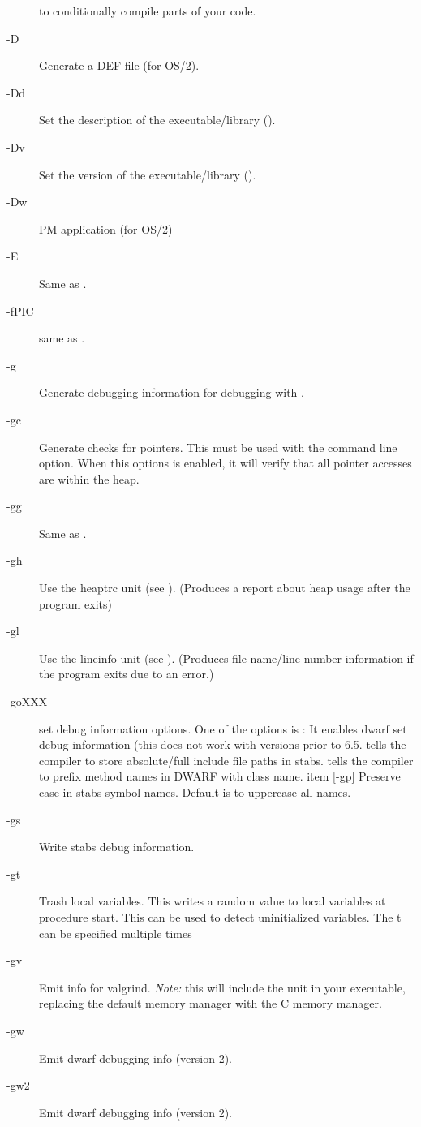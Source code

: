 \begin{description}
to conditionally compile parts of your code.
\item [-D] Generate a DEF file (for OS/2).
\item [-Dd] Set the description of the executable/library (\windows).
\item [-Dv] Set the version of the executable/library (\windows).
\item [-Dw] PM application (for OS/2)
\item [-E]  Same as .
\item [-fPIC] same as .
\item [-g]  Generate debugging information for debugging with
.
\item [-gc] Generate checks for pointers. This must be used with the
 command line option. When this options is enabled, it will verify
that all pointer accesses are within the heap.
\item [-gg] Same as .
\item [-gh] Use the heaptrc unit (see \unitsref). (Produces a report
about heap usage after the program exits)
\item [-gl] Use the lineinfo unit (see \unitsref). (Produces file
name/line number information if the program exits due to an error.)
\item[-goXXX] set debug information options. One of the options is
: It enables dwarf set debug information (this does not work
with  versions prior to 6.5.   tells the compiler to store absolute/full include file paths in stabs.
 tells the compiler to prefix method names in DWARF with class name.
item [-gp] Preserve case in stabs symbol names. Default is to uppercase all
names.
\item [-gs] Write stabs debug information.
\item [-gt] Trash local variables. This writes a random value to local
variables at procedure start. This can be used to detect uninitialized
variables. The t can be specified multiple times
\item [-gv] Emit info for valgrind. {\em Note:} this will include the 
unit in your executable, replacing the default memory manager with the C memory
manager.
\item [-gw] Emit dwarf debugging info (version 2).
\item [-gw2] Emit dwarf debugging info (version 2).

\end{description}
